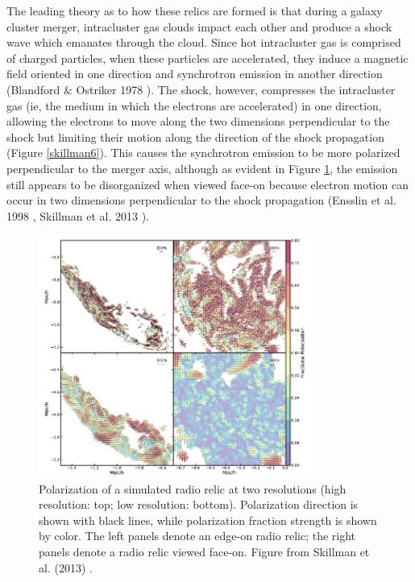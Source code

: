 \documentclass[12 pt]{article}
\renewcommand{\baselinestretch}{2}
\begin{document}
The leading theory as to how these relics are formed is that during a galaxy cluster merger, intracluster gas clouds impact each other and produce a shock wave which emanates through the cloud. Since hot intracluster gas is comprised of charged particles, when these particles are accelerated, they induce a magnetic field oriented in one direction and synchrotron emission in another direction (Blandford \& Ostriker 1978 \cite{Blandford78}). The shock, however, compresses the intracluster gas (ie, the medium in which the electrons are accelerated) in one direction, allowing the electrons to move along the two dimensions perpendicular to the shock but limiting their motion along the direction of the shock propagation (Figure \ref{skillman6}). This causes the synchrotron emission to be more polarized perpendicular to the merger axis, although as evident in Figure \ref{skillman9}, the emission still appears to be disorganized when viewed face-on because electron motion can occur in two dimensions perpendicular to the shock propagation (Ensslin et al. 1998 \cite{Ensslin98}, Skillman et al. 2013 \cite{Skillman13}). 

\renewcommand{\baselinestretch}{1}
\begin{figure}[h!]
\caption{Polarization of a simulated radio relic at two resolutions (high resolution: top; low resolution: bottom). Polarization direction is shown with black lines, while polarization fraction strength is shown by color. The left panels denote an edge-on radio relic; the right panels denote a radio relic viewed face-on. Figure from Skillman et al. (2013) \cite{Skillman13}.}
\label{skillman9}
\centering
\includegraphics[width=0.8\textwidth]{skillman9}
\end{figure}
\renewcommand{\baselinestretch}{2}
\end{document}

